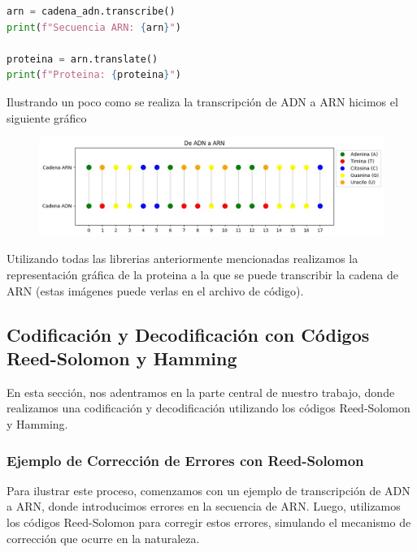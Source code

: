 \begin{lstlisting}[language=Python]
arn = cadena_adn.transcribe()
print(f"Secuencia ARN: {arn}")

proteina = arn.translate()
print(f"Proteina: {proteina}")
\end{lstlisting}
Ilustrando un poco como se realiza la transcripción de ADN a ARN hicimos el siguiente gráfico
\begin{figure}[h]
\centering
        \includegraphics[scale=0.25]{arn.png} 
    \end{figure}
Utilizando todas las librerias anteriormente mencionadas realizamos la representación gráfica de la proteina a la que se puede transcribir la cadena de ARN (estas imágenes puede verlas en el archivo de código).\\


\subsection{Codificación y Decodificación con Códigos Reed-Solomon y Hamming}

En esta sección, nos adentramos en la parte central de nuestro trabajo, donde realizamos una codificación y decodificación utilizando los códigos Reed-Solomon y Hamming.

\subsubsection{Ejemplo de Corrección de Errores con Reed-Solomon}
Para ilustrar este proceso, comenzamos con un ejemplo de transcripción de ADN a ARN, donde introducimos errores en la secuencia de ARN. Luego, utilizamos los códigos Reed-Solomon para corregir estos errores, simulando el mecanismo de corrección que ocurre en la naturaleza.

